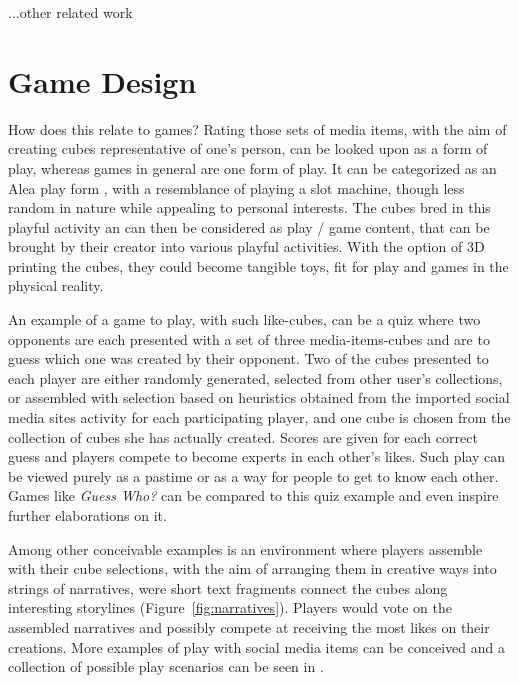 \documentclass[]{article}
\begin{document}
...other related work




\section{Game Design}
\label{sec:GameDesign}

How does this relate to games?  Rating those sets of media items, with the aim of creating cubes representative of one's person, can be looked upon as a form of play, whereas games in general are one form of play.  It can be categorized as an Alea play form \cite{caillois2001man}, with a resemblance of playing a slot machine, though less random in nature while appealing to personal interests.  The cubes bred in this playful activity an can then be considered as play / game content, that can be brought by their creator into various playful activities.  With the option of 3D printing the cubes, they could become tangible toys, fit for play and games in the physical reality.

An example of a game to play, with such like-cubes, can be a quiz where two opponents are each presented with a set of three media-items-cubes and are to guess which one was created by their opponent.  Two of the cubes presented to each player are either randomly generated, selected from other user's collections, or assembled with selection based on heuristics obtained from the imported social media sites activity for each participating player, and one cube is chosen from the collection of cubes she has actually created.  Scores are given for each correct guess and players compete to become experts in each other's likes.  Such play can be viewed purely as a pastime or as a way for people to get to know each other.  Games like \textit{Guess Who?}\cite{GuessWho} can be compared to this quiz example and even inspire further elaborations on it.

Among other conceivable examples is an environment where players assemble with their cube selections, with the aim of arranging them in creative ways into strings of narratives, were short text fragments connect the cubes along interesting storylines (Figure~\ref{fig:narratives}).  Players would vote on the assembled narratives and possibly compete at receiving the most likes on their creations.  More examples of play with social media items can be conceived and a collection of possible play scenarios can be seen in \cite{GoLplay}.
\end{document}
